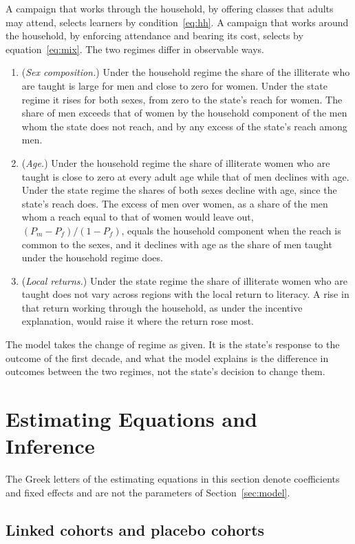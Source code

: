 A campaign that works through the household, by offering classes that adults may attend, selects learners by condition~\eqref{eq:hh}. A campaign that works around the household, by enforcing attendance and bearing its cost, selects by equation~\eqref{eq:mix}. The two regimes differ in observable ways.
\begin{enumerate}
\item[H1] (\emph{Sex composition.}) Under the household regime the share of the illiterate who are taught is large for men and close to zero for women. Under the state regime it rises for both sexes, from zero to the state's reach for women. The share of men exceeds that of women by the household component of the men whom the state does not reach, and by any excess of the state's reach among men.
\item[H2] (\emph{Age.}) Under the household regime the share of illiterate women who are taught is close to zero at every adult age while that of men declines with age. Under the state regime the shares of both sexes decline with age, since the state's reach does. The excess of men over women, as a share of the men whom a reach equal to that of women would leave out, $(P_m-P_f)/(1-P_f)$, equals the household component when the reach is common to the sexes, and it declines with age as the share of men taught under the household regime does.
\item[H3] (\emph{Local returns.}) Under the state regime the share of illiterate women who are taught does not vary across regions with the local return to literacy. A rise in that return working through the household, as under the incentive explanation, would raise it where the return rose most.
\end{enumerate}
The model takes the change of regime as given. It is the state's response to the outcome of the first decade, and what the model explains is the difference in outcomes between the two regimes, not the state's decision to change them.

\section{Estimating Equations and Inference}\label{sec:strategy}

The Greek letters of the estimating equations in this section denote coefficients and fixed effects and are not the parameters of Section~\ref{sec:model}.

\subsection{Linked cohorts and placebo cohorts}

